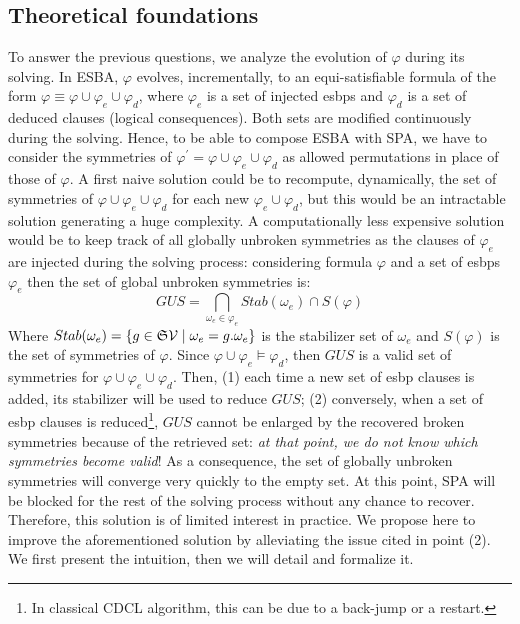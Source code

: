 \subsection{Theoretical foundations}
\label{sec:tf}
To answer the previous questions, we analyze the evolution of $\varphi$ during
its solving. In ESBA, $\varphi$ evolves, incrementally, to an
equi-satisfiable formula of the form $\varphi \equiv \varphi \cup \varphi_e
\cup \varphi_d$, where $\varphi_e$ is a set of injected esbps and $\varphi_d$
is a set of deduced clauses (logical consequences). Both sets are modified continuously during the solving. Hence, to be able to compose ESBA with SPA, we have to consider the symmetries of $\varphi^\prime=\varphi \cup \varphi_e \cup \varphi_d$ as
allowed permutations in place of those of $\varphi$.
A first naive solution could be to recompute, dynamically, the set of symmetries of $\varphi
\cup \varphi_e \cup \varphi_d$ for each new $\varphi_e \cup \varphi_d$, but
this would be an intractable solution generating a huge complexity. 
A  computationally less expensive solution would be to keep track of all globally unbroken symmetries as the clauses of $\varphi_e$ are injected during the solving process: considering formula $\varphi$ and 
a set of esbps $\varphi_e$ then the set of global unbroken symmetries is:
$$GUS = \underset{\omega_e \in \varphi_e}{\bigcap}Stab(\omega_e) \cap S(\varphi)$$
 Where  $Stab(\omega_e)=\{g \in \mathfrak{S}{\mathcal{V}}\mid
\omega_e=g.\omega_e\}$ is the stabilizer set of $\omega_e$ and $S(\varphi)$ is the set of symmetries of $\varphi$. 
Since $\varphi \cup \varphi_e  \models \varphi_d$, then $GUS$ is a valid set of symmetries for $\varphi \cup \varphi_e \cup \varphi_d$.
Then, (1) each time a new set of esbp clauses is added, its stabilizer will be used to reduce $GUS$;
(2) conversely, when a set of esbp clauses is reduced\footnote{In classical CDCL algorithm, this can be due to a back-jump or a restart.},
$GUS$ cannot be enlarged by the recovered broken symmetries because of the retrieved set:
\textit{at that point, we do not know which symmetries become valid}! 
As a consequence, the set of globally unbroken symmetries will converge very quickly to the empty set. 
At this point, SPA will be blocked for the rest of the solving process without any chance to recover.
 Therefore, this solution is of limited interest in practice.
We propose here to improve the aforementioned solution by alleviating the issue cited in point (2).
We first present the intuition, then we will detail and formalize it. 
